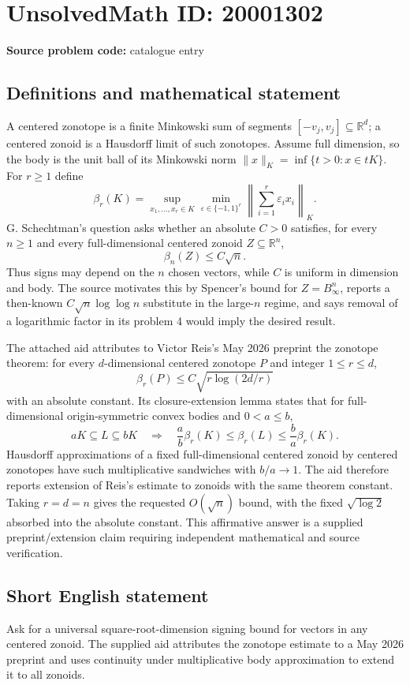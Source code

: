 \documentclass[11pt]{article}
\newcommand{\R}{\mathbb{R}}
\begin{document}
\section*{UnsolvedMath ID: 20001302}
\textbf{Source problem code:} catalogue entry
\subsection{Definitions and mathematical statement}
A centered zonotope is a finite Minkowski sum of segments $[-v_j,v_j]\subseteq\R^d$; a centered zonoid is a Hausdorff limit of such zonotopes. Assume full dimension, so the body is the unit ball of its Minkowski norm $\|x\|_K=\inf\{t>0:x\in tK\}$. For $r\geq1$ define
\[
 \beta_r(K)=\sup_{x_1,\ldots,x_r\in K}
 \min_{\varepsilon\in\{-1,1\}^r}\left\|\sum_{i=1}^r\varepsilon_i x_i\right\|_K.
\]
G. Schechtman's question asks whether an absolute $C>0$ satisfies, for every $n\geq1$ and every full-dimensional centered zonoid $Z\subseteq\R^n$,
\[
 \beta_n(Z)\leq C\sqrt n.
\]
Thus signs may depend on the $n$ chosen vectors, while $C$ is uniform in dimension and body. The source motivates this by Spencer's bound for $Z=B_\infty^n$, reports a then-known $C\sqrt n\log\log n$ substitute in the large-$n$ regime, and says removal of a logarithmic factor in its problem 4 would imply the desired result.

The attached aid attributes to Victor Reis's May 2026 preprint the zonotope theorem: for every $d$-dimensional centered zonotope $P$ and integer $1\leq r\leq d$,
\[
 \beta_r(P)\leq C\sqrt{r\log(2d/r)}
\]
with an absolute constant. Its closure-extension lemma states that for full-dimensional origin-symmetric convex bodies and $0<a\leq b$,
\[
 aK\subseteq L\subseteq bK
 \quad\Longrightarrow\quad
 \frac ab\beta_r(K)\leq\beta_r(L)\leq\frac ba\beta_r(K).
\]
Hausdorff approximations of a fixed full-dimensional centered zonoid by centered zonotopes have such multiplicative sandwiches with $b/a\to1$. The aid therefore reports extension of Reis's estimate to zonoids with the same theorem constant. Taking $r=d=n$ gives the requested $O(\sqrt n)$ bound, with the fixed $\sqrt{\log2}$ absorbed into the absolute constant. This affirmative answer is a supplied preprint/extension claim requiring independent mathematical and source verification.
\subsection{Short English statement}
Ask for a universal square-root-dimension signing bound for vectors in any centered zonoid. The supplied aid attributes the zonotope estimate to a May 2026 preprint and uses continuity under multiplicative body approximation to extend it to all zonoids.
\end{document}
